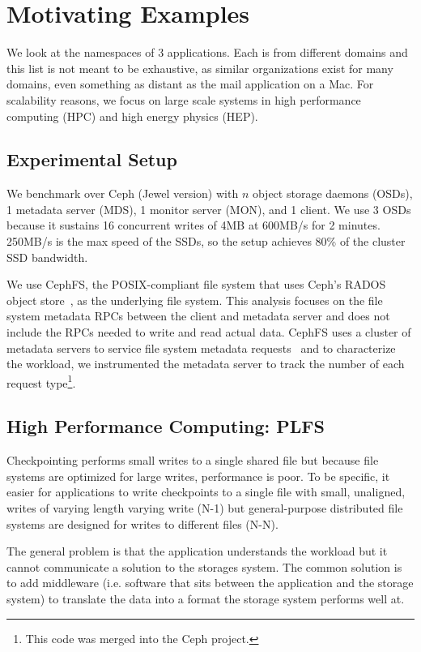\section{Motivating Examples}

We look at the namespaces of 3 applications.  Each is from different domains
and this list is not meant to be exhaustive, as similar organizations exist for
many domains, even something as distant as the mail application on a Mac. For
scalability reasons, we focus on large scale systems in high performance
computing (HPC) and high energy physics (HEP).

\subsection*{Experimental Setup}

We benchmark over Ceph (Jewel version) with \(n\) object storage daemons
(OSDs), 1 metadata server (MDS), 1 monitor server (MON), and 1 client.  We use
3 OSDs because it sustains 16 concurrent writes of 4MB at 600MB/s for 2
minutes. 250MB/s is the max speed of the SSDs, so the setup achieves 80\% of
the cluster SSD bandwidth.

We use CephFS, the POSIX-compliant file system that uses Ceph's RADOS object
store~\cite{weil:osdi2006-ceph}, as the underlying file system.  This analysis
focuses on the file system metadata RPCs between the client and metadata server
and does not include the RPCs needed to write and read actual data.  CephFS
uses a cluster of metadata servers to service file system metadata
requests~\cite{weil:sc2004-dyn-metadata} and to characterize the workload, we
instrumented the metadata server to track the number of each request
type\footnote{This code was merged into the Ceph project.}.

\subsection{High Performance Computing: PLFS}
\label{sec:plfs}
Checkpointing performs small writes to a single shared file but because
file systems are optimized for large writes, performance is poor. To be
specific, it easier for applications to write checkpoints to a single file with
small, unaligned, writes of varying length varying write (N-1) but
general-purpose distributed file systems are designed for writes to different
files (N-N).

The general problem is that the application understands the workload but it cannot
communicate a solution to the storages system. The common solution is to add
middleware (i.e. software that sits between the application and the storage
system) to translate the data into a format the storage system performs well
at. 

